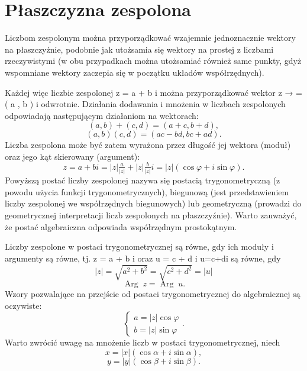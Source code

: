 \documentclass{article}
\begin{document}
\section{Płaszczyzna zespolona}
Liczbom zespolonym można przyporządkować wzajemnie jednoznacznie wektory na płaszczyźnie, podobnie jak utożsamia się wektory na prostej z liczbami rzeczywistymi (w obu przypadkach można utożsamiać również same punkty, gdyż wspomniane wektory zaczepia się w początku układów współrzędnych).

Każdej więc liczbie zespolonej z = a + b i można przyporządkować wektor z → = ( a , b ) i odwrotnie. Działania dodawania i mnożenia w liczbach zespolonych odpowiadają następującym działaniom na wektorach: 
$${ (a,b)+(c,d)=(a+c,b+d),}$$
$${ (a,b)(c,d)=(ac-bd,bc+ad).}$$
Liczba zespolona może być zatem wyrażona przez długość jej wektora (moduł) oraz jego kąt skierowany (argument): 
$${ z=a+bi=|z|{\tfrac {a}{|z|}}+|z|{\tfrac {b}{|z|}}i=|z|(\cos \varphi +i\sin \varphi ).}$$
Powyższą postać liczby zespolonej nazywa się postacią trygonometryczną (z powodu użycia funkcji trygonometrycznych), biegunową (jest przedstawieniem liczby zespolonej we współrzędnych biegunowych) lub geometryczną (prowadzi do geometrycznej interpretacji liczb zespolonych na płaszczyźnie). Warto zauważyć, że postać algebraiczna odpowiada współrzędnym prostokątnym.

Liczby zespolone w postaci trygonometrycznej są równe, gdy ich moduły i argumenty są równe, tj. z = a + b i  oraz u = c + d i  u=c+di są równe, gdy 
$$|z|={\sqrt  {a^{2}+b^{2}}}={\sqrt  {c^{2}+d^{2}}}=|u|$$
$${ \operatorname {Arg} \;z=\operatorname {Arg} \;u.}$$
Wzory pozwalające na przejście od postaci trygonometrycznej do algebraicznej są oczywiste: 
$${ {\begin{cases}a=|z|\cos \varphi \\b=|z|\sin \varphi \end{cases}}.}$$
Warto zwrócić uwagę na mnożenie liczb w postaci trygonometrycznej, niech 
$${ x=|x|(\cos \alpha +i\sin \alpha ),}$$
$${ y=|y|(\cos \beta +i\sin \beta ).}$$
\end{document}
